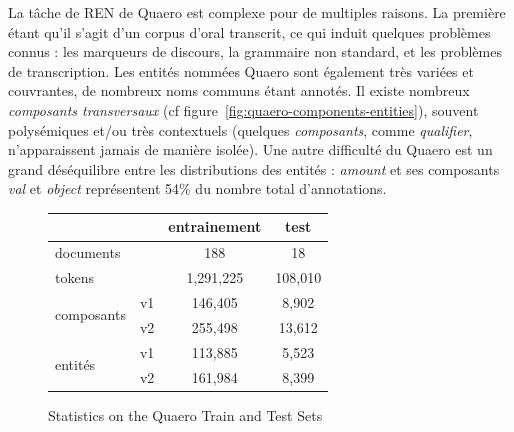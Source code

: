 \documentclass[citation\_needed]{subfiles}
\begin{document}
La tâche de REN de Quaero est complexe pour de multiples raisons. La première étant qu'il s'agit d'un corpus d'oral transcrit, ce qui induit quelques problèmes connus : les marqueurs de discours, la grammaire non standard, et les problèmes de transcription. Les entités nommées Quaero sont également très variées et couvrantes, de nombreux noms communs étant annotés. Il existe nombreux \emph{composants transversaux} (cf figure\ \ref{fig:quaero-components-entities}), souvent polysémiques et/ou très contextuels (quelques \emph{composants}, comme \emph{qualifier}, n'apparaissent jamais de manière isolée). Une autre difficulté du Quaero est un grand déséquilibre entre les distributions des entités : \emph{amount} et ses composants \emph{val} et \emph{object} représentent 54\% du nombre total d'annotations.

\begin{figure}[ht!]
    \centering
    \begin{tabular}{|lc|c|c|}
    \cline{3-4}
    \multicolumn{2}{c|}{}            & entrainement & test \\
    \hline
    \multicolumn{2}{|l|}{documents}  & 188          & 18 \\
    \multicolumn{2}{|l|}{tokens}     & 1,291,225    & 108,010 \\
    \hline
    \multirow{2}{*}{composants} & v1 & 146,405      & 8,902 \\
                                & v2 & 255,498      & 13,612 \\
    \hline
    \multirow{2}{*}{entités}    & v1 & 113,885      & 5,523 \\
                                & v2 & 161,984      & 8,399 \\
    \hline
    \end{tabular}
    \caption{Statistics on the Quaero Train and Test Sets}
    \label{fig:quaero-nombres}
\end{figure}
\end{document}
